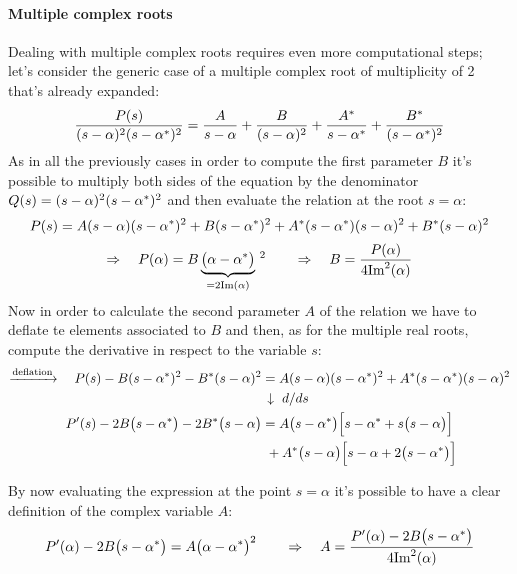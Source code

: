 	\paragraph{Multiple complex roots} Dealing with multiple complex roots requires even more computational steps; let's consider the generic case of a multiple complex root of multiplicity of 2 that's already expanded:
	\[ \frac {P(s)}{(s-\alpha)^2(s-\alpha^*)^2} = \frac{A}{s-\alpha} + \frac{B}{(s-\alpha)^2} + \frac{A^*}{s-\alpha^*} + \frac{B^*}{(s-\alpha^*)^2} \]
	As in all the previously cases in order to compute the first parameter $B$ it's possible to multiply both sides of the equation by the denominator $Q(s) = (s-\alpha)^2(s-\alpha^*)^2$ and then evaluate the relation at the root $s = \alpha$:
	\[ P(s) = A (s-\alpha)(s-\alpha^*)^2 + B (s-\alpha^*)^2 + A^*(s-\alpha^*)(s-\alpha)^2 + B^* (s-\alpha)^2  \]
	\[ \Rightarrow \quad P(\alpha) = B \underbrace{\big(\alpha-\alpha^*\big)}_{=2\textrm{Im}\left(\alpha\right)} \,^2 \qquad \Rightarrow \quad B = \frac{P(\alpha)}{4 \textrm{Im}^2(\alpha)} \]
	Now in order to calculate the second parameter $A$ of the relation we have to deflate te elements associated to $B$ and then, as for the multiple real roots, compute the derivative in respect to the variable $s$:
	\begin{align*} 	
	\xrightarrow{\textrm{deflation}} \quad P(s) - B(s-\alpha^*)^2 - B^*(s-\alpha)^2  & = A(s-\alpha)(s-\alpha^*)^2 + A^*(s-\alpha^*)(s-\alpha)^2 \\
	& \, \downarrow \ d/ds \\
	P'(s) - 2B\big(s-\alpha^*\big) - 2B^*\big(s-\alpha\big) & = A \big(s-\alpha^*\big) \Big[ s-\alpha^* + s \big(s-\alpha\big) \Big] \\ & \  + A^* \big(s-\alpha\big)\Big[ s-\alpha + 2\big(s-\alpha^*\big) \Big]
	\end{align*} 

	By now evaluating the expression at the point $s = \alpha$ it's possible to have a clear definition of the complex variable $A$:
	\[ P'(\alpha) - 2B \big(s-\alpha^*\big) = A \big(\alpha-\alpha^*\big)^2 \qquad \Rightarrow \quad A = \frac{P'(\alpha) - 2B\big(s-\alpha^*\big)}{4\textrm{Im}^2(\alpha)} \]	
	
